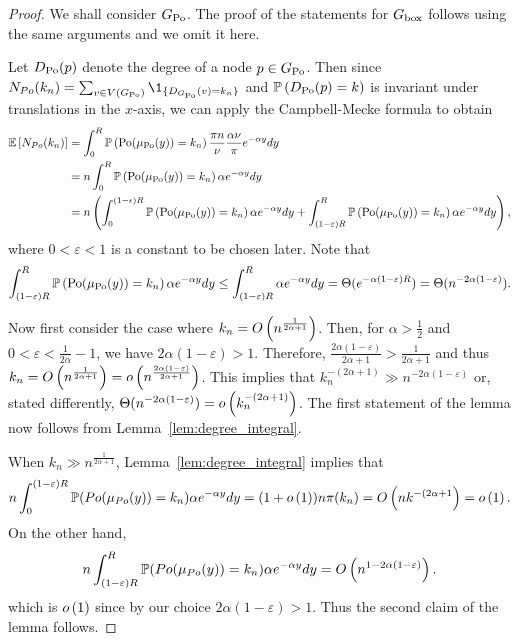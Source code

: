 \begin{proof}
We shall consider $G_{{\mathrm{Po}}}$. The proof of the statements for $G_{\mathrm{box}}$ follows using the same arguments and we omit it here. 

Let $D_{{\mathrm{Po}}}(p)$ denote the degree of a node $p \in G_{{\mathrm{Po}}}$. Then since $N_{Po}(k_n)= \sum_{v\in V(\GPo)}\1_{\{D_{\GPo}(v)=k_n\}}$ and $\mathbb{P}\left(D_{{\mathrm{Po}}}(p) = k\right)$ is invariant under translations in the $x$-axis, we can apply the Campbell-Mecke formula to obtain
\begin{align*}
	\mathbb{E}\left[N_{Po}(k_n)\right] 
	&= \int_0^R \mathbb{P}\left({\mathrm{Po}}(\mu_{{\mathrm{Po}}}(y)) = k_n\right) \frac{\pi n}{\nu}\frac{\alpha \nu}{\pi} e^{-\alpha y}dy \\
	&=n \int_0^R \mathbb{P}\left({\mathrm{Po}}(\mu_{{\mathrm{Po}}}(y)) = k_n\right) \alpha e^{-\alpha y}dy \\
	&=n\left( \int_0^{(1-\epsilon)R} \mathbb{P}\left({\mathrm{Po}}(\mu_{{\mathrm{Po}}}(y)) = k_n\right) \alpha e^{-\alpha y}dy
		+ \int_{(1-\varepsilon)R}^R \mathbb{P}\left({\mathrm{Po}}(\mu_{{\mathrm{Po}}}(y)) = k_n\right) \alpha e^{-\alpha y}dy \right),
\end{align*}
where $0 < \varepsilon < 1$ is a constant to be chosen later.
Note that
\begin{align*}
	\int_{(1-\varepsilon)R}^R \Prob{\Po(\mu_{\Po}(y)) = k_n}\alpha e^{-\alpha y}dy 
	\le \int_{(1-\varepsilon)R}^R \alpha e^{-\alpha y}dy 
	= \Theta(e^{-\alpha (1-\varepsilon) R}) = \Theta(n^{-2\alpha(1-\varepsilon)}) .%
\end{align*}

Now first consider the case where $k_n = O\left(n^{\frac{1}{2\alpha + 1}}\right)$. Then, for $\alpha > \frac{1}{2}$ and $0 < \varepsilon < \frac{1}{2\alpha} - 1$, we have $2\alpha(1-\varepsilon)>1$. Therefore, $\frac{2\alpha (1-\varepsilon)}{2\alpha+1}>\frac{1}{2\alpha+1}$ and thus
$k_n = O\left(n^{\frac{1}{2\alpha+1}}\right) = o\left(n^{\frac{2\alpha(1-\varepsilon)}{2\alpha+1}}\right)$. This implies that $k_n^{-(2\alpha+1)} \gg n^{-2\alpha(1-\varepsilon)}$ or, stated differently, $\Theta(n^{-2\alpha(1-\varepsilon)}) = o\left(k_n^{-(2\alpha+1)}\right)$. The first statement of the lemma now follows from Lemma~\ref{lem:degree_integral}.

When $k_n \gg n^{\frac{1}{2\alpha + 1}}$, Lemma~\ref{lem:degree_integral} implies that
\[
	n \int_0^{(1-\varepsilon)R} \mathbb{P}(Po(\mu_{Po}(y))=k_n) \alpha e^{-\alpha y}dy
	= (1+o\left(1\right)) n {\pi}(k_n)= O\left(n k^{-(2\alpha + 1}\right) = o\left(1\right).
\]
On the other hand,
\[
	n \int_{(1-\varepsilon)R}^R \mathbb{P}(Po(\mu_{Po}(y))=k_n) \alpha e^{-\alpha y}dy = O\left(n^{1 - 2\alpha(1-\varepsilon)}\right).
\]
which is $o\left(1\right)$ since by our choice $2\alpha(1-\varepsilon) > 1$. Thus the second claim of the lemma follows.
\end{proof}

